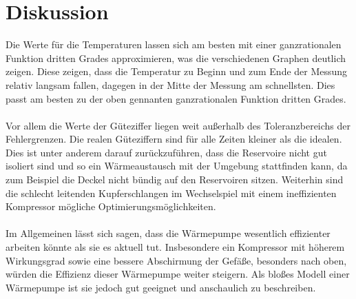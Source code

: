 \section{Diskussion}
Die Werte für die Temperaturen lassen sich am besten mit einer ganzrationalen
Funktion dritten Grades approximieren, was die verschiedenen Graphen deutlich zeigen.
Diese zeigen, dass die Temperatur zu Beginn und zum Ende der Messung relativ langsam
fallen, dagegen in der Mitte der Messung am schnellsten. Dies passt am besten zu der
oben gennanten ganzrationalen Funktion dritten Grades.
\\
\\
Vor allem die Werte der Güteziffer liegen weit außerhalb des Toleranzbereichs
der Fehlergrenzen. Die realen Güteziffern sind für alle Zeiten kleiner als die
idealen. Dies ist unter anderem darauf zurückzuführen, dass die Reservoire nicht
gut isoliert sind und so ein Wärmeaustausch mit der Umgebung stattfinden kann,
da zum Beispiel die Deckel nicht bündig auf den Reservoiren sitzen.
Weiterhin sind die schlecht leitenden Kupferschlangen im Wechselspiel mit einem
ineffizienten Kompressor mögliche Optimierungsmöglichkeiten.
\\
\\
Im Allgemeinen lässt sich sagen, dass die Wärmepumpe wesentlich effizienter arbeiten
könnte als sie es aktuell tut. Insbesondere ein Kompressor mit höherem Wirkungsgrad
sowie eine bessere Abschirmung der Gefäße, besonders nach oben, würden die Effizienz
dieser Wärmepumpe weiter steigern. Als bloßes Modell einer Wärmepumpe ist sie jedoch gut geeignet
und anschaulich zu beschreiben.
\newpage
\nocite{*}
\printbibliography
